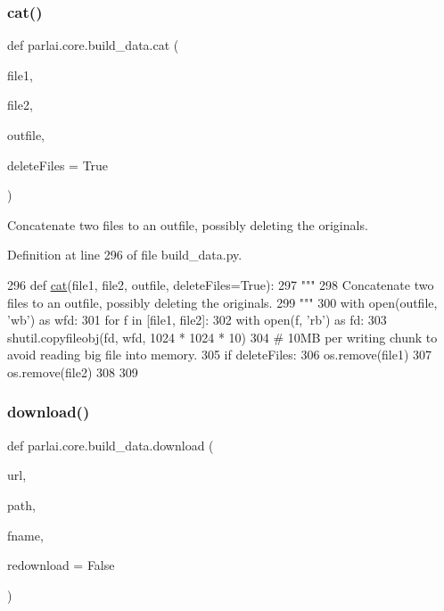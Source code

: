 \subsubsection{\texorpdfstring{cat()}{cat()}}
{\footnotesize\ttfamily def parlai.\+core.\+build\+\_\+data.\+cat (\begin{DoxyParamCaption}\item[{}]{file1,  }\item[{}]{file2,  }\item[{}]{outfile,  }\item[{}]{delete\+Files = {\ttfamily True} }\end{DoxyParamCaption})}

\begin{DoxyVerb}Concatenate two files to an outfile, possibly deleting the originals.
\end{DoxyVerb}
 

Definition at line 296 of file build\+\_\+data.\+py.


\begin{DoxyCode}
296 \textcolor{keyword}{def }\hyperlink{namespaceparlai_1_1core_1_1build__data_adc4feba864e2a0d0663cdf6bf84afaf6}{cat}(file1, file2, outfile, deleteFiles=True):
297     \textcolor{stringliteral}{"""}
298 \textcolor{stringliteral}{    Concatenate two files to an outfile, possibly deleting the originals.}
299 \textcolor{stringliteral}{    """}
300     with open(outfile, \textcolor{stringliteral}{'wb'}) \textcolor{keyword}{as} wfd:
301         \textcolor{keywordflow}{for} f \textcolor{keywordflow}{in} [file1, file2]:
302             with open(f, \textcolor{stringliteral}{'rb'}) \textcolor{keyword}{as} fd:
303                 shutil.copyfileobj(fd, wfd, 1024 * 1024 * 10)
304                 \textcolor{comment}{# 10MB per writing chunk to avoid reading big file into memory.}
305     \textcolor{keywordflow}{if} deleteFiles:
306         os.remove(file1)
307         os.remove(file2)
308 
309 
\end{DoxyCode}
\mbox{\label{namespaceparlai_1_1core_1_1build__data_ab74f0e428f05e5d91fa93c8afb367622}} 
\subsubsection{\texorpdfstring{download()}{download()}}
{\footnotesize\ttfamily def parlai.\+core.\+build\+\_\+data.\+download (\begin{DoxyParamCaption}\item[{}]{url,  }\item[{}]{path,  }\item[{}]{fname,  }\item[{}]{redownload = {\ttfamily False} }\end{DoxyParamCaption})}

